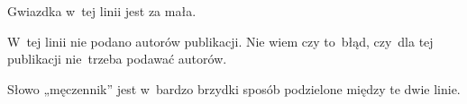 \documentclass[a4paper,11pt]{article}
\begin{document}
\start {} Gwiazdka w~tej linii jest za mała.

\vspace{\spaceFour}


\start {} W~tej linii nie podano autorów publikacji. Nie
wiem czy to~błąd, czy~dla tej publikacji nie~trzeba podawać autorów.

\vspace{\spaceFour}


\start {} Słowo „męczennik” jest
w~bardzo brzydki sposób podzielone między te dwie linie.








\end{document}
